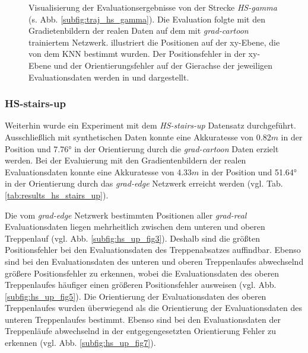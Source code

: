 \begin{figure}
\begin{tabularx}{0.9\textwidth}{>{\centering\arraybackslash}p{} X}
	\end{tabularx}
	\caption{Visualisierung der Evaluationsergebnisse von der Strecke \textit{HS-gamma} (s. Abb. \ref{subfig:traj_hs_gamma}). Die Evaluation folgte mit den Gradietenbildern der realen Daten auf dem mit \textit{grad-cartoon} trainiertem Netzwerk.  illustriert die Positionen auf der xy-Ebene, die von dem KNN bestimmt wurden. Der Positionsfehler in der xy-Ebene und der Orientierungsfehler auf der Gierachse der jeweiligen Evaluationsdaten werden in   und   dargestellt.}
	\label{fig:result_hs_gamma}
\end{figure}

\subsubsection{HS-stairs-up}
\label{subsubsec:hs_stairs_up}

Weiterhin wurde ein Experiment mit dem \textit{HS-stairs-up} Datensatz durchgeführt. Ausschließlich mit synthetischen Daten konnte eine Akkuratesse von 0.82$m$ in der Position und 7.76° in der Orientierung durch die \textit{grad-cartoon} Daten erzielt werden. Bei der Evaluierung mit den Gradientenbildern der realen Evaluationsdaten konnte eine Akkuratesse von 4.33$m$ in der Position und 51.64° in der Orientierung durch das \textit{grad-edge} Netzwerk erreicht werden (vgl. Tab. \ref{tab:results_hs_stairs_up}). 


Die vom \textit{grad-edge} Netzwerk bestimmten Positionen aller \textit{grad-real} Evaluationsdaten liegen mehrheitlich zwischen dem unteren und oberen Treppenlauf (vgl. Abb. \ref{subfig:hs_up_fig3}). Deshalb sind die größten Positionsfehler bei den Evaluationsdaten des Treppenabsatzes auffindbar. Ebenso sind bei den Evaluationsdaten des unteren und oberen Treppenlaufes abwechselnd größere Positionsfehler zu erkennen, wobei die Evaluationsdaten des oberen Treppenlaufes häufiger einen größeren Positionsfehler ausweisen (vgl. Abb. \ref{subfig:hs_up_fig5}). Die Orientierung der Evaluationsdaten des oberen Treppenlaufes wurden überwiegend als die Orientierung der Evaluationsdaten des unteren Treppenlaufes bestimmt. Ebenso sind bei den Evaluationsdaten der Treppenläufe abwechselnd in der entgegengesetzten Orientierung Fehler zu erkennen (vgl. Abb. \ref{subfig:hs_up_fig7}).

